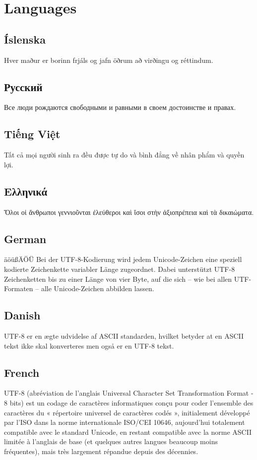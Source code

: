 \section{Languages}

\subsection{Íslenska}
Hver maður er borinn frjáls og jafn öðrum að virðingu og réttindum.
 
\subsection{Русский}  
Все люди рождаются свободными и равными в своем достоинстве и 
правах.
 
\subsection{Tiếng Việt}
Tất cả mọi người sinh ra đều được tự do và bình đẳng về nhân phẩm và 
quyền lợi.
 
\subsection{Ελληνικά} 
Ὅλοι οἱ ἄνθρωποι γεννιοῦνται ἐλεύθεροι καὶ ἴσοι στὴν ἀξιοπρέπεια 
καὶ τὰ δικαιώματα.

\subsection{German}
äöüßÄÖÜ Bei der UTF-8-Kodierung wird jedem Unicode-Zeichen eine speziell kodierte Zeichenkette variabler Länge zugeordnet. Dabei unterstützt UTF-8 Zeichenketten bis zu einer Länge von vier Byte, auf die sich – wie bei allen UTF-Formaten – alle Unicode-Zeichen abbilden lassen.

\subsection{Danish}
UTF-8 er en ægte udvidelse af ASCII standarden, hvilket betyder at en ASCII tekst ikke skal konverteres men også er en UTF-8 tekst.

\subsection{French}
UTF-8 (abréviation de l’anglais Universal Character Set Transformation Format - 8 bits) est un codage de caractères informatiques conçu pour coder l’ensemble des caractères du « répertoire universel de caractères codés », initialement développé par l’ISO dans la norme internationale ISO/CEI 10646, aujourd’hui totalement compatible avec le standard Unicode, en restant compatible avec la norme ASCII limitée à l’anglais de base (et quelques autres langues beaucoup moins fréquentes), mais très largement répandue depuis des décennies.

